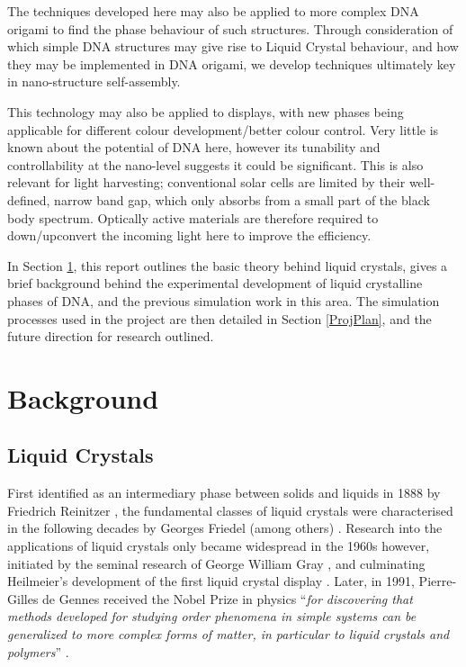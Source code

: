 \documentclass[11pt, a4paper]{article} %
\begin{document}
The techniques developed here may also be applied to more complex DNA origami to find the phase behaviour of such structures. Through consideration of which simple DNA structures may give rise to Liquid Crystal behaviour, and how they may be implemented in DNA origami, we develop techniques ultimately key in nano-structure self-assembly.

This technology may also be applied to displays, with new phases being applicable for different colour development/better colour control. Very little is known about the potential of DNA here, however its tunability and controllability at the nano-level suggests it could be significant. This is also relevant for light harvesting; conventional solar cells are limited by their well-defined, narrow band gap, which only absorbs from a small part of the black body spectrum. Optically active materials are therefore required to down/upconvert the incoming light here to improve the efficiency.

In Section \ref{LitReview}, this report outlines the basic theory behind liquid crystals, gives a brief background behind the experimental development of liquid crystalline phases of DNA, and the previous simulation work in this area. The simulation processes used in the project are then detailed in Section \ref{ProjPlan}, and the future direction for research outlined.


\section{Background} \label{LitReview}
\subsection{Liquid Crystals}
First identified as an intermediary phase between solids and liquids in 1888 by Friedrich Reinitzer \cite{Reinitzer1888}, the fundamental classes of liquid crystals were characterised in the following decades by Georges Friedel (among others) \cite{Friedel1922}. Research into the applications of liquid crystals only became widespread in the 1960s however, initiated by the seminal research of George William Gray \cite{Gray1962}, and culminating Heilmeier's development of the first liquid crystal display \cite{Heilmeier1969, Heilmeier1968}. Later, in 1991, Pierre-Gilles de Gennes  received the Nobel Prize in physics ``\textit{for discovering that methods developed for studying order phenomena in simple systems can be generalized to more complex forms of matter, in particular to liquid crystals and polymers}'' \cite{deGennes1992}.
\end{document}
